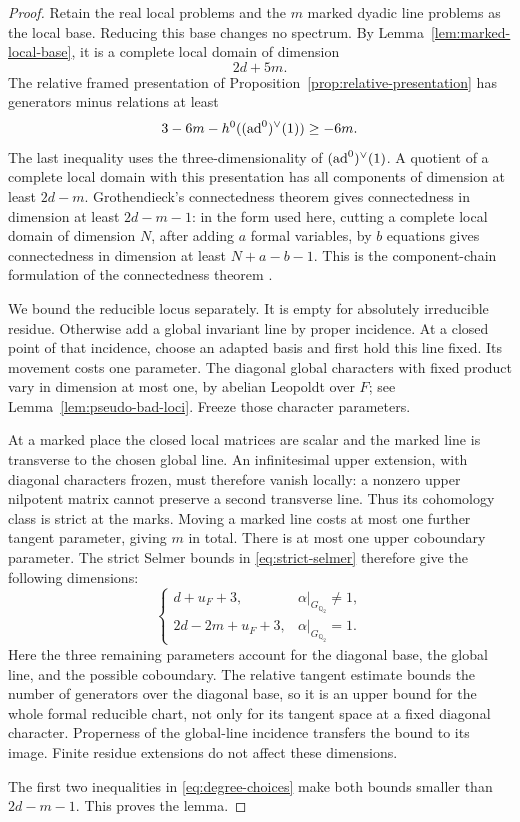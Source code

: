 \begin{proof}
Retain the real local problems and the \(m\) marked
dyadic line problems as the local base. Reducing this
base changes no spectrum. By
Lemma~\ref{lem:marked-local-base}, it is a complete
local domain of dimension
\[
 2d+5m.
\]
The relative framed presentation of
Proposition~\ref{prop:relative-presentation} has
generators minus relations at least
\[
 3-6m-h^0((\operatorname{ad}^0)^\vee(1))\ge-6m.
\]
The last inequality uses the three-dimensionality of
\((\operatorname{ad}^0)^\vee(1)\). A quotient of a complete local
domain with this presentation has all components of
dimension at least \(2d-m\). Grothendieck's
connectedness theorem gives connectedness in dimension
at least \(2d-m-1\): in the form used here, cutting a
complete local domain of dimension \(N\), after adding
\(a\) formal variables, by \(b\) equations gives
connectedness in dimension at least \(N+a-b-1\).
This is the component-chain formulation of the
connectedness theorem \cite[Expos\'e~XIII, Th\'eor\`eme~2.1]{SGA2}.

We bound the reducible locus separately.
It is empty for absolutely irreducible residue.
Otherwise add a global invariant line by proper
incidence. At a closed point of that incidence,
choose an adapted basis and first hold this line
fixed. Its movement costs one parameter.
The diagonal global characters with fixed product
vary in dimension at most one, by abelian
Leopoldt over \(F\); see
Lemma~\ref{lem:pseudo-bad-loci}.
Freeze those character parameters.

At a marked place the closed local matrices are
scalar and the marked line is transverse to the
chosen global line. An infinitesimal upper extension,
with diagonal characters frozen, must therefore
vanish locally: a nonzero upper nilpotent matrix
cannot preserve a second transverse line.
Thus its cohomology class is strict at the marks.
Moving a marked line costs at most one further
tangent parameter, giving \(m\) in total.
There is at most one upper coboundary parameter.
The strict Selmer bounds in \eqref{eq:strict-selmer}
therefore give the following dimensions:
\[
 \begin{cases}
 d+u_F+3,&\alpha|_{G_{\mathbb Q_2}}\ne1,\\
 2d-2m+u_F+3,&\alpha|_{G_{\mathbb Q_2}}=1.
 \end{cases}
\]
Here the three remaining parameters account for
the diagonal base, the global line, and the
possible coboundary. The relative tangent estimate
bounds the number of generators over the diagonal
base, so it is an upper bound for the whole formal
reducible chart, not only for its tangent space at
a fixed diagonal character. Properness of the
global-line incidence transfers the bound to
its image. Finite residue extensions do not
affect these dimensions.

The first two inequalities in
\eqref{eq:degree-choices} make both bounds smaller
than \(2d-m-1\). This proves the lemma.
\end{proof}

